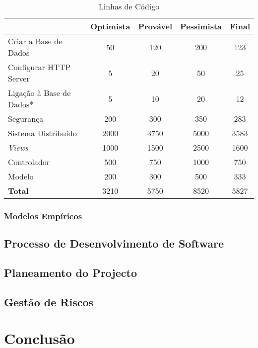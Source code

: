 \documentclass[12pt, a4paper, twoside]{report} %
\begin{document}
\begin{table}[h]
\centering
\begin{tabular}{|l|c|c|c|c|}
\hline
                       		& Optimista & Provável & Pessimista & Final \\ \hline
Criar a Base de Dados  		& 50        & 120      & 200        & 123   \\ \hline
Configurar HTTP Server 		& 5         & 20       & 50         & 25    \\ \hline
Ligação à Base de Dados*	& 5         & 10       & 20         & 12    \\ \hline
Segurança              		& 200       & 300      & 350        & 283   \\ \hline
Sistema Distribuído         & 2000      & 3750     & 5000       & 3583   \\ \hline
\textit{Views}            	& 1000      & 1500     & 2500       & 1600  \\ \hline
Controlador                 & 500       & 750      & 1000       & 750   \\ \hline
Modelo                      & 200       & 300      & 500        & 333   \\ \hline
\textbf{Total}		   		& 3210      & 5750     & 8520       & 5827  \\ \hline
\end{tabular}
\caption{Linhas de Código}
\label{codigo}
\end{table}

\subsection{Modelos Empíricos}

\section{Processo de Desenvolvimento de Software}

\section{Planeamento do Projecto}

\section{Gestão de Riscos}

\chapter{Conclusão}
\end{document}
